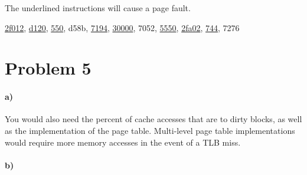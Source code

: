 \documentclass[12pt]{article}
\begin{document}
The underlined instructions will cause a page fault.
\begin{center}
        \underline{2f012}, \underline{d120}, \underline{550}, d58b, \underline{7194}, \underline{30000}, 7052,
        \underline{5550}, \underline{2fa02}, \underline{744}, 7276
\end{center}

\section*{Problem 5}

\paragraph{a)}

You would also need the percent of cache accesses that are to dirty blocks, as well as the implementation of the page table.
Multi-level page table implementations would require more memory accesses in the event of a TLB miss.

\paragraph{b)}
\end{document}
